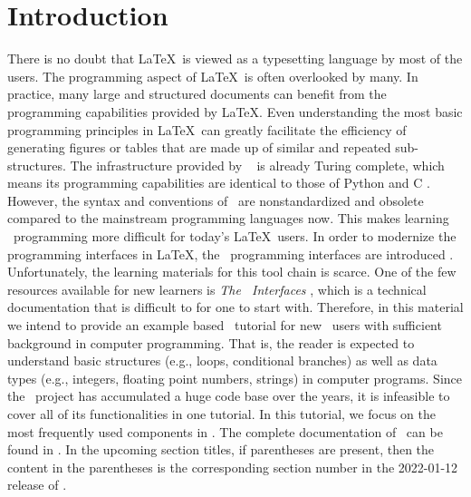 \documentclass{ltugboat}
\begin{document}
\section{Introduction}
There is no doubt that \LaTeX~is viewed as a typesetting language by most of the users.
The programming aspect of \LaTeX~is often overlooked by many.
In practice, many large and structured documents can benefit from the programming capabilities provided by \LaTeX. 
Even understanding the most basic programming principles in \LaTeX~can greatly facilitate the efficiency of generating figures or tables that are made up of similar and repeated sub-structures.
The infrastructure provided by \LaTeXe\ \cite{berry2017latex} is already Turing complete, which means its programming capabilities are identical to those of Python \cite{vanrossum2010python} and C \cite{ritchie1988c}.
However, the syntax and conventions of \LaTeXe~are nonstandardized and obsolete compared to the mainstream programming languages now.
This makes learning \LaTeXe~programming more difficult for today's \LaTeX~users.
In order to modernize the programming interfaces in \LaTeX, the \liii~programming interfaces are introduced \cite{mittelbach2020quo}.
Unfortunately, the learning materials for this tool chain is scarce.
One of the few resources available for new learners is \emph{The \liii\ Interfaces} \cite{l3interface}, which is a technical documentation that is difficult to for one to start with.
Therefore, in this material we intend to provide an example based \liii\ tutorial for new \liii\ users with sufficient background in computer programming.
That is, the reader is expected to understand basic structures (e.g., loops, conditional branches) as well as data types (e.g., integers, floating point numbers, strings) in computer programs. 
Since the \liii~project has accumulated a huge code base over the years, it is infeasible to cover all of its functionalities in one tutorial.
In this tutorial, we focus on the most frequently used components in \liii. 
The complete documentation of \liii\  can be found in \cite{l3interface}. 
In the upcoming section titles, if parentheses are present, then the content in the parentheses is the corresponding section number in the 2022-01-12 release of \cite{l3interface}.
\end{document}
